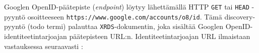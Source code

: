 \documentclass[finnish,gradu]{tktltiki}
\begin{document}

  Googlen OpenID-päätepiste (\emph{endpoint}) löytyy lähettämällä HTTP \verb#GET# tai \verb#HEAD# -pyyntö osoitteeseen \verb#https://www.google.com/accounts/o8/id#. Tämä discovery-pyyntö (todo termi) palauttaa \verb#XRDS#-dokumentin, joka sisältää Googlen OpenID-identiteetintarjoajan päätepisteen URL:n. Identiteetintarjoajan URL ilmaistaan vastauksessa seuraavasti \cite{google_openid_dev_docs}:
\end{document}
